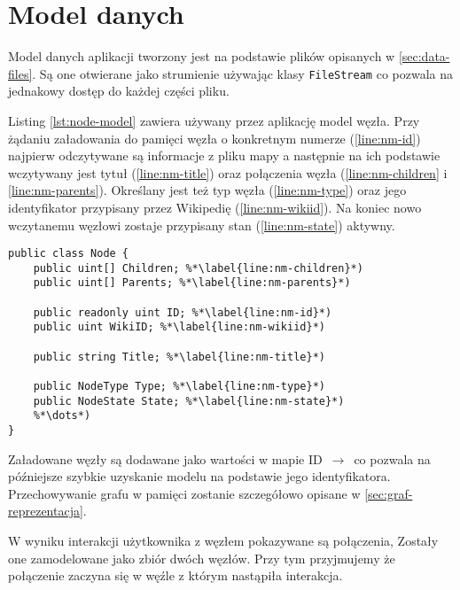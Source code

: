 \section{Model danych}

Model danych aplikacji tworzony jest na podstawie plików opisanych w \ref{sec:data-files}. Są one otwierane jako strumienie używając klasy \lstinline[basicstyle=\normalsize]{FileStream} co pozwala na jednakowy dostęp do każdej części pliku. 

Listing \ref{lst:node-model} zawiera używany przez aplikację model węzła. Przy żądaniu załadowania do pamięci węzła o konkretnym numerze (\ref{line:nm-id}) najpierw odczytywane są informacje z pliku mapy a następnie na ich podstawie wczytywany jest tytuł (\ref{line:nm-title}) oraz połączenia węzła (\ref{line:nm-children} i \ref{line:nm-parents}). Określany jest też typ węzła (\ref{line:nm-type}) oraz jego identyfikator przypisany przez Wikipedię (\ref{line:nm-wikiid}). Na koniec nowo wczytanemu węzłowi zostaje przypisany stan (\ref{line:nm-state}) aktywny.
\begin{lstlisting}[caption={Model węzła grafu}, label=lst:node-model]
public class Node {
	public uint[] Children; %*\label{line:nm-children}*)
	public uint[] Parents; %*\label{line:nm-parents}*)

	public readonly uint ID; %*\label{line:nm-id}*)
	public uint WikiID; %*\label{line:nm-wikiid}*)

	public string Title; %*\label{line:nm-title}*)

	public NodeType Type; %*\label{line:nm-type}*)
	public NodeState State; %*\label{line:nm-state}*)
	%*\dots*)
}
\end{lstlisting}

Załadowane węzły są dodawane jako wartości w mapie ID $\,\to\,$  co pozwala na późniejsze szybkie uzyskanie modelu na podstawie jego identyfikatora. Przechowywanie grafu w pamięci zostanie szczegółowo opisane w \ref{sec:graf-reprezentacja}.

W wyniku interakcji użytkownika z węzłem pokazywane są połączenia, Zostały one zamodelowane jako zbiór dwóch węzłów. Przy tym przyjmujemy że połączenie zaczyna się w węźle z którym nastąpiła interakcja.
